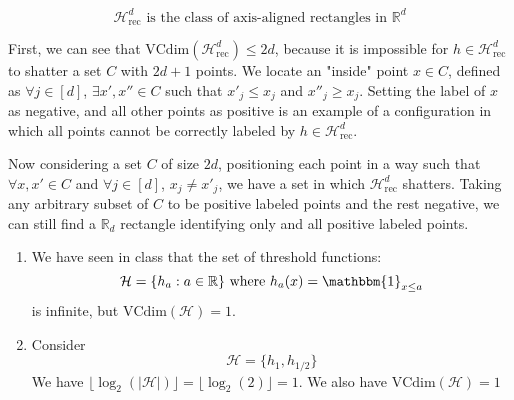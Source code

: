 \documentclass[10pt]{article}
\newcommand{\R}{\mathbb{R}}
\newenvironment{problem}[2][Problem]{\begin{trivlist}
\item[\hskip \labelsep {\bfseries #1}\hskip \labelsep {\bfseries #2.}]}{\end{trivlist}}
\begin{document}
\begin{problem}{5}
    $$\mathcal{H}_{\text{rec}}^d \text{ is the class of axis-aligned rectangles in } \R^d$$

    First, we can see that $\text{VCdim}(\mathcal{H}_{\text{rec}}^d) \leq 2d$, because it is impossible for $h \in \mathcal{H}_{\text{rec}}^d$ to shatter a set $C$ with $2d+1$ points. We locate an "inside" point $x \in C$, defined as $\forall j \in [d]$, $\exists x', x'' \in C$ such that $x'_j \leq x_j$ and $x''_j \geq x_j$. Setting the label of $x$ as negative, and all other points as positive is an example of a configuration in which all points cannot be correctly labeled by $h \in \mathcal{H}_{\text{rec}}^d$.
    
    Now considering a set $C$ of size $2d$, positioning each point in a way such that $\forall x, x' \in C$ and $\forall j \in [d]$, $x_j \neq x'_j$, we have a set in which $\mathcal{H}_{\text{rec}}^d$ shatters. Taking any arbitrary subset of $C$ to be positive labeled points and the rest negative, we can still find a $\R_d$ rectangle identifying only and all positive labeled points.

\end{problem}

\begin{problem}{7}
    \hfill
    \begin{enumerate}
        \item
            We have seen in class that the set of threshold functions:
            $$\mathcal{H} = \{h_a : a \in \R\} \text{ where } h_a(x) = \mathbbm{1}_{x \leq a}$$
            is infinite, but $\text{VCdim}(\mathcal{H}) = 1$.
        \item 
            Consider
            $$\mathcal{H} = \{h_1, h_{1/2}\}$$
            We have 
            $\lfloor \log_2(|\mathcal{H}|) \rfloor = \lfloor \log_2(2) \rfloor = 1$.
            We also have
            $\text{VCdim}(\mathcal{H}) = 1$
    \end{enumerate}
\end{problem}
\end{document}
